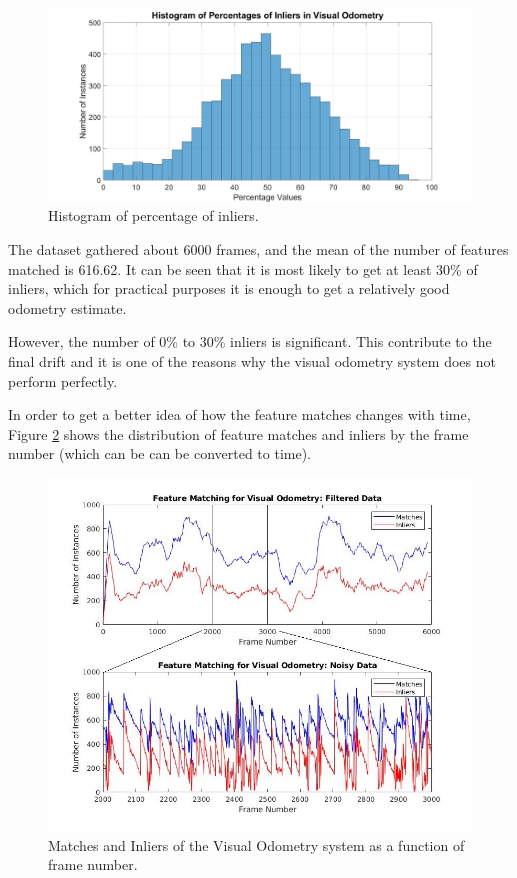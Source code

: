 \documentclass[11pt]{article}
\begin{document}
\begin{figure}[h]
	\includegraphics[width=\linewidth]{VisualOdometry/PercentageHistogram}
	\caption{Histogram of percentage of inliers.}
	\label{fig:PorcentageInliers}
\end{figure}

The dataset gathered about 6000 frames, and the mean of the number of features matched is 616.62. It can be seen that it is most likely to get at least 30\% of inliers, which for practical purposes it is enough to get a relatively good odometry estimate.

However, the number of 0\% to 30\% inliers is significant. This contribute to the final drift and it is one of the reasons why the visual odometry system does not perform perfectly.

In order to get a better idea of how the feature matches changes with time, Figure \ref{fig:InliersandOutliersVO} shows the distribution of feature matches and inliers by the frame number (which can be can be converted to time). 

\begin{figure}[h]
	\includegraphics[width=\linewidth]{VisualOdometry/InliertoMatches}
	\caption{Matches and Inliers of the Visual Odometry system as a function of frame number.}
	\label{fig:InliersandOutliersVO}
\end{figure}
\end{document}
